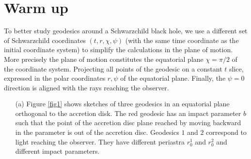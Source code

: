 \documentclass[10pt, a4paper]{article}
\begin{document}
\section{Warm up}
To better study geodesics around a Schwarzchild black hole, we use a different set of Schwarzchild coordinates $(t, r, \chi, \psi)$ (with the same time coordinate as the initial coordinate system) to simplify the calculations in the plane of motion. More precisely the plane of motion constitutes the equatorial plane $\chi = \pi/2$ of the coordinate system. Projecting all points of the geodesic on a constant $t$ slice, expressed in the polar coordinates $r, \psi$
of the equatorial plane. Finally, the $\psi = 0$ direction is aligned with the rays reaching the observer. 

\begin{enumerate}
  \item[(a)] Figure \ref{fig1} shows sketches of three geodesics in an equatorial plane orthogonal to the accretion disk. The red geodesic has an impact parameter $b$ such that the point of the accretion disc plane reached by moving backward in the parameter is out of the accretion disc. Geodesics $1$ and $2$ correspond to light reaching the observer. They have different periastra $r_0^1$ and $r_0^2$ and different impact parameters.
  \begin{figure}[h!]
    \centering
\end{figure}
\end{enumerate}
\end{document}

